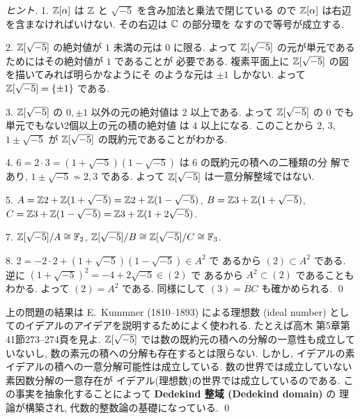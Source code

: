 \documentclass[12pt,twoside]{jarticle}
\begin{document}
\begin{proof}[ヒント]
1. ${\mathbb Z}[\alpha]$ は ${\mathbb Z}$ と $\sqrt{-5}$ を含み加法と乗法で閉じている
ので ${\mathbb Z}[\alpha]$ は右辺を含まなければいけない.  その右辺は ${\mathbb C}$ の部分環を
なすので等号が成立する. 

2. ${\mathbb Z}[\sqrt{-5}]$ の絶対値が $1$ 未満の元は $0$ に限る.
よって ${\mathbb Z}[\sqrt{-5}]$ の元が単元であるためにはその絶対値が $1$ であることが
必要である.  複素平面上に ${\mathbb Z}[\sqrt{-5}]$ の図を描いてみれば明らかなようにそ
のような元は $\pm1$ しかない.  よって ${\mathbb Z}[\sqrt{-5}] = \{\pm1\}$ である.

3. ${\mathbb Z}[\sqrt{-5}]$ の $0,\pm1$ 以外の元の絶対値は $2$ 以上である. 
よって ${\mathbb Z}[\sqrt{-5}]$ の $0$ でも単元でもない2個以上の元の積の絶対値
は $4$ 以上になる.  
このことから $2$, $3$, $1\pm\sqrt{-5}$ が ${\mathbb Z}[\sqrt{-5}]$ 
の既約元であることがわかる.  

4. $6=2\cdot 3=(1+\sqrt{-5})(1-\sqrt{-5})$ は $6$ の既約元の積への二種類の分
解であり,  $1\pm\sqrt{-5}\not\sim 2,3$ である. 
よって ${\mathbb Z}[\sqrt{-5}]$ は一意分解整域ではない.

5. $A={\mathbb Z} 2+{\mathbb Z}(1+\sqrt{-5})={\mathbb Z} 2+{\mathbb Z}(1-\sqrt{-5})$, 
$B={\mathbb Z} 3+{\mathbb Z}(1+\sqrt{-5})$,
$C={\mathbb Z} 3+{\mathbb Z}(1-\sqrt{-5})={\mathbb Z} 3+{\mathbb Z}(1+2\sqrt{-5})$.

7. ${\mathbb Z}[\sqrt{-5}]/A\cong{\mathbb F}_2$,
${\mathbb Z}[\sqrt{-5}]/B\cong{\mathbb Z}[\sqrt{-5}]/C\cong{\mathbb F}_3$.

8. $2=-2\cdot 2+(1+\sqrt{-5})(1-\sqrt{-5})\in A^2$ で
あるから $(2)\subset A^2$ である.
逆に $(1+\sqrt{-5})^2=-4+2\sqrt{-5}\in(2)$ で
あるから $A^2\subset(2)$ であることもわかる.
よって $(2)=A^2$ である.
同様にして $(3)=BC$ も確かめられる.
\qed
\end{proof}

\begin{guide}
上の問題の結果は E.~Kummner (1810--1893) による理想数 (ideal number) 
としてのイデアルのアイデアを説明するためによく使われる. 
たとえば高木 \cite{takagi2} 第5章第41節273--274頁を見よ.
${\mathbb Z}[\sqrt{-5}]$ では数の既約元の積への分解の一意性も成立していないし, 
数の素元の積への分解も存在するとは限らない. しかし, 
イデアルの素イデアルの積への一意分解可能性は成立している.
数の世界では成立していない素因数分解の一意存在が
イデアル(理想数)の世界では成立しているのである.
この事実を抽象化することによって {\bf Dedekind 整域 (Dedekind domain)} の
理論が構築され, 代数的整数論の基礎になっている.
\qed
\end{guide}

\end{document}
